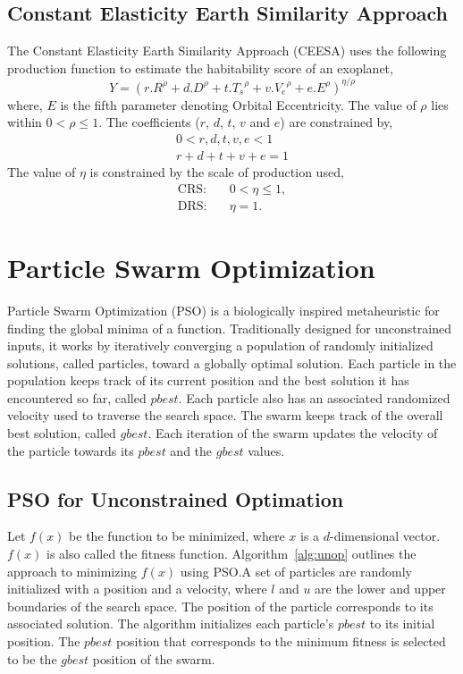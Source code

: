 \documentclass[10pt]{article}
\begin{document}
\subsection{Constant Elasticity Earth Similarity Approach}\label{subsec:ceesa}
The Constant Elasticity Earth Similarity Approach (CEESA) uses the following production function to estimate the
habitability score of an exoplanet,
\begin{equation}\label{eq:ceesa}
  Y = {(r.R^\rho+d.D^\rho+t.{T_s}^\rho+v.{V_e}^\rho+e.E^\rho)}^{\eta/\rho}
\end{equation}
where, $E$ is the fifth parameter denoting Orbital Eccentricity. The value of $\rho$ lies within $0<\rho\leq 1$.
The coefficients ($r$, $d$, $t$, $v$ and $e$) are constrained by,
\begin{subequations}
  \begin{align}
      0 < r,d,t,v,e < 1\\
      r+d+t+v+e = 1
  \end{align}
\end{subequations}
The value of $\eta$ is constrained by the scale of production used,
\begin{subequations}
  \begin{alignat}{3}
    \text{CRS:} & \quad 0 < \eta \leq 1,\\
    \text{DRS:} & \quad \eta = 1.
  \end{alignat}
\end{subequations}

\section{Particle Swarm Optimization}\label{sec:pso}
Particle Swarm Optimization (PSO) is a biologically inspired metaheuristic for finding the global minima of a function.
Traditionally designed for unconstrained inputs, it works by iteratively converging a population of randomly initialized
solutions, called particles, toward a globally optimal solution. Each particle in the population keeps track of its
current position and the best solution it has encountered so far, called $pbest$. Each particle also has an associated
randomized velocity used to traverse the search space. The swarm keeps track of the overall best solution, called
$gbest$. Each iteration of the swarm updates the velocity of the particle towards its $pbest$ and the $gbest$ values.

\subsection{PSO for Unconstrained Optimation}\label{subsec:uopso}
Let $f(x)$ be the function to be minimized, where $x$ is a $d$-dimensional vector. $f(x)$ is also called the fitness
function. Algorithm~\ref{alg:unop} outlines the approach to minimizing $f(x)$ using PSO.\@ A set of particles are randomly
initialized with a position and a velocity, where $l$ and $u$ are the lower and upper boundaries of the search space.
The position of the particle corresponds to its associated solution. The algorithm initializes each particle's $pbest$
to its initial position. The $pbest$ position that corresponds to the minimum fitness is selected to be the $gbest$
position of the swarm.
\end{document}
